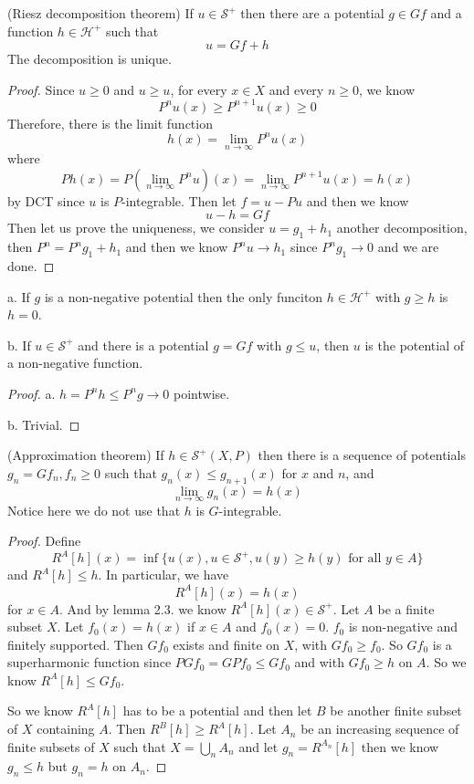 \documentclass[lang=en,11pt,a4paper,citestyle =authoryear]{elegantpaper}
\newcommand{\Har}{\mathcal{H}}
\newcommand{\Sar}{\mathcal{S}}
\begin{document}
\begin{theorem}
    (Riesz decomposition theorem) If $u\in \Sar^+$ then there are a potential $g\in Gf$ and a function $h\in\Har^+$ such that
    \[u = Gf + h\]
    The decomposition is unique.
\end{theorem}
\begin{proof}
    Since $u\geq 0$ and $u\geq u$, for every $x\in X$ and every $n\geq 0$, we know
    \[
    P^nu(x) \geq P^{n+1}u(x) \geq 0
    \]
    Therefore, there is the limit function
    \[
    h(x) = \lim_{n\to\infty} P^nu(x)
    \]
    where
    \[
    Ph(x) = P(\lim_{n\to\infty} P^n u)(x) = \lim_{n\to\infty}P^{n+1}u(x) = h(x)
    \]
    by DCT since $u$ is $P$-integrable. Then let $f = u - Pu$ and then we know
    \[
    u-h = Gf
    \]
    Then let us prove the uniqueness, we consider $u = g_1+h_1$ another decomposition, then $P^n = P^ng_1 + h_1$ and then we know $P^n u \to h_1$ since $P^ng_1 \to 0$ and we are done.
\end{proof}

\begin{corollary}
    a. If $g$ is a non-negative potential then the only funciton $h\in \Har^+$ with $g\geq h$ is $h = 0$.\par
    b. If $u \in \Sar^+$ and there is a potential $g = Gf$ with $g\leq u$, then $u$ is the potential of a non-negative function.
\end{corollary}
\begin{proof}
    a. $h = P^n h \leq P^ng \to 0$ pointwise.\par
    b. Trivial. 
\end{proof}

\begin{theorem}
    (Approximation theorem) If $h \in \Sar^+(X,P)$ then there is a sequence of potentials $g_n = Gf_n, f_n \geq 0$ such that $g_n(x) \leq g_{n+1}(x)$ for $x$ and $n$, and
    \[
    \lim_{n\to\infty} g_n(x) = h(x)
    \]
    Notice here we do not use that $h$ is $G$-integrable.
\end{theorem}
\begin{proof}
    Define
    \[
    R^A[h](x) = \inf\{u(x), u\in\Sar^+, u(y) \geq h(y)\text{ for all }y\in A\}
    \]
    and $R^A[h] \leq h$. In particular, we have
    \[
    R^A[h](x) = h(x) 
    \]
    for $x\in A$. And by lemma 2.3. we know $R^A[h](x) \in \Sar^+$. Let $A$ be a finite subset $X$. Let $f_0 (x) = h(x)$ if $x\in A$ and $f_0(x) = 0$. $f_0$ is non-negative and finitely supported. Then $Gf_0$ exists and finite on $X$, with $Gf_0 \geq f_0$. So $Gf_0$ is a superharmonic function since $P Gf_0 = GPf_0 \leq Gf_0$ and with $Gf_0 \geq h$ on  $A$. So we know $R^A[h]\leq Gf_0$.\par
    So we know $R^A[h]$ has to be a potential and then let $B$ be another finite subset of $X$ containing $A$. Then $R^{B}[h]\geq R^{A}[h]$. Let $A_n$ be an increasing sequence of finite subsets of $X$ such that $X = \bigcup_{n}A_n$ and let $g_n = R^{A_n}[h]$ then we know $g_n \leq h$ but $g_n = h$ on $A_n$. 
\end{proof}
\end{document}
